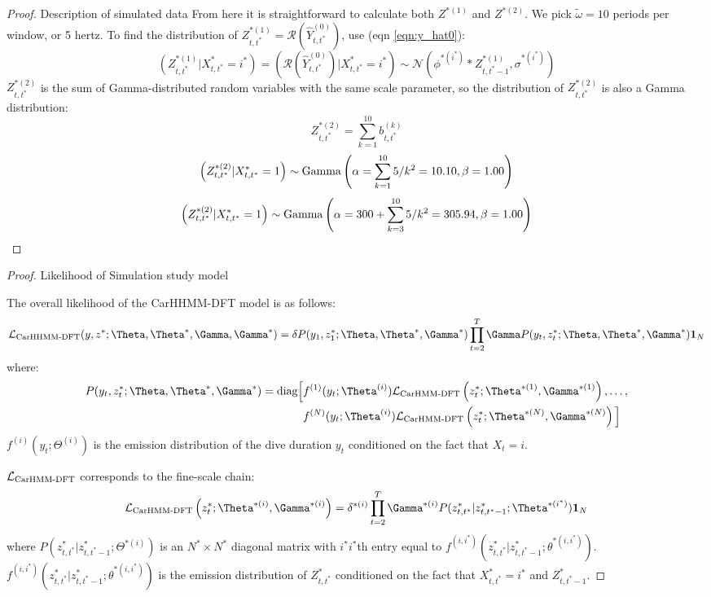 \begin{proof}{Description of simulated data}{}
From here it is straightforward to calculate both $Z^{*(1)}$ and $Z^{*(2)}$. We pick $\tilde{\omega} = 10$ periods per window, or 5 hertz. To find the distribution of $Z^{*(1)}_{t,t^*} = \mathcal{R}\left(\hat{Y}^{(0)}_{t,t^*}\right)$, use (eqn \ref{eqn:y_hat0}):
%
$$\left(Z^{*(1)}_{t,t^*} | X^*_{t,t^*} = i^* \right) = \left(\mathcal{R}\left(\hat{Y}^{(0)}_{t,t^*}\right) | X^*_{t,t^*} = i^* \right) \sim \mathcal{N} \left(\phi^{*(i^*)} * Z^{*(1)}_{t,t^*-1}, \sigma^{*(i^*)} \right)$$
%
$Z^{*(2)}_{t,t^*}$ is the sum of Gamma-distributed random variables with the same scale parameter, so the distribution of $Z^{*(2)}_{t,t^*}$ is also a Gamma distribution:
%
$$Z^{*(2)}_{t,t^*} = \sum_{k=1}^{10} b^{(k)}_{t,t^*}$$
$$\left(Z^{*(2)}_{t,t^*}|X^*_{t,t^*} = 1\right) \sim {\rm{Gamma}}\left(\alpha = \sum_{k=1}^{10} 5/k^2 = 10.10, \beta = 1.00 \right)$$
$$\left(Z^{*(2)}_{t,t^*}|X^*_{t,t^*} = 1\right) \sim {\rm{Gamma}}\left(\alpha = 300 + \sum_{k=3}^{10} 5/k^2 = 305.94 , \beta = 1.00 \right)$$
\end{proof}

\begin{proof}{Likelihood of Simulation study model}{}

The overall likelihood of the CarHHMM-DFT model is as follows:
%
$$\calL_{\text{CarHHMM-DFT}}(y,z^*;\Theta,\Theta^*,\Gamma,\Gamma^*) = \delta P(y_1,z_1^*;\Theta,\Theta^*,\Gamma^*) \prod_{t=2}^T \Gamma P(y_t,z_t^*;\Theta,\Theta^*,\Gamma^*) \mathbf{1}_N$$
%
where:
%
\begin{align*}
P(y_t,z_t^*;\Theta,\Theta^*,\Gamma^*)  = \text{diag}\Big[&f^{(1)}(y_t;\Theta^{(i)})\calL_{\text{CarHMM-DFT}}\left(z_t^*;\Theta^{*(1)},\Gamma^{*(1)}\right), \ldots , \\
&f^{(N)}(y_t;\Theta^{(i)})\calL_{\text{CarHMM-DFT}}\left(z_t^*;\Theta^{*(N)},\Gamma^{*(N)}\right) \Big]
\end{align*}
%
$f^{(i)}(y_t;\Theta^{(i)})$ is the emission distribution of the dive duration $y_t$ conditioned on the fact that $X_t = i$.

$\mathcal{L}_{\text{CarHMM-DFT}}$ corresponds to the fine-scale chain:
%
$$\calL_{\text{CarHMM-DFT}}\left(z_t^*;\Theta^{*(i)},\Gamma^{*(i)}\right) = \delta^{*(i)} \prod_{t=2}^T \Gamma^{*(i)} P(z^*_{t,t^*}|z^*_{t,t^*-1};\Theta^{*(i^*)}) \mathbf{1}_N$$
%
where $P(z^*_{t,t^*}|z^*_{t,t^*-1};\Theta^{*(i)})$ is an $N^* \times N^*$ diagonal matrix with $i^*i^*$th entry equal to $f^{(i,i^*)}(z^*_{t,t^*}|z^*_{t,t^*-1}; \theta^{*(i,i^*)})$.
%
$f^{(i,i^*)}(z^*_{t,t^*}|z^*_{t,t^*-1}; \theta^{*(i,i^*)})$ is the emission distribution of $Z^*_{t,t^*}$ conditioned on the fact that $X^*_{t,t^*} = i^*$ and $Z^*_{t,t^*-1}$.

\end{proof}

